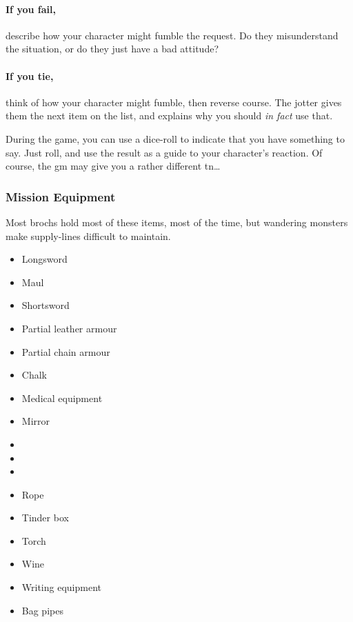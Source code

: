 \begin{multicols}{2}
\paragraph{If you fail,}
describe how your character might fumble the request.
Do they misunderstand the situation, or do they just have a bad attitude?

\paragraph{If you tie,}
think of how your character might fumble, then reverse course.
The jotter gives them the next item on the list, and explains why you should \emph{in fact} use that.

During the game, you can use a dice-roll to indicate that you have something to say.
Just roll, and use the result as a guide to your character's reaction.%
Of course, the \gls{gm} may give you a rather different \gls{tn}\ldots

\subsubsection{Mission Equipment}
\label{start_equipment}

Most \glspl{broch} hold most of these items, most of the time, but wandering monsters make supply-lines difficult to maintain.

\begin{multicols}{2}
\begin{itemize}
\raggedright
  \item
  Longsword
  \item
  Maul
  \item
  Shortsword
  \item
  Partial leather armour
  \item
  Partial chain armour
  \item
  Chalk
  \item
  Medical equipment
  \item
  Mirror
  \item
  \rations
  \item
  \rations
  \item
  \rations
  \item
  Rope
  \item
  Tinder box
  \item
  Torch
  \item
  Wine
  \item
  Writing equipment
  \item
  Bag pipes
\end{itemize}


\end{multicols}
\end{multicols}
